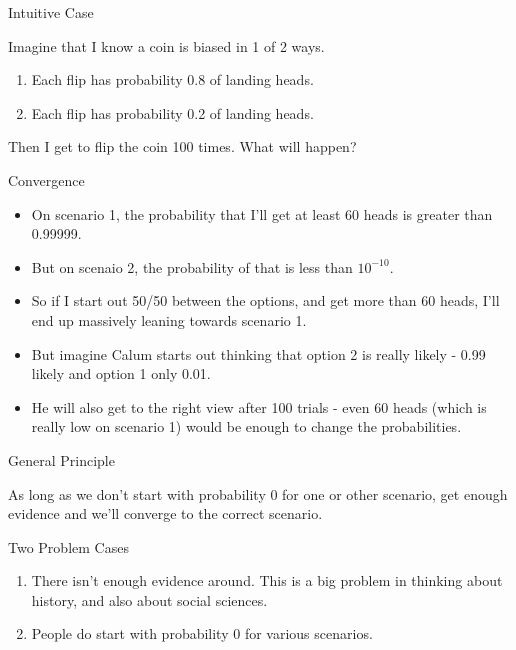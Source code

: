 \documentclass[
  ignorenonframetext,
]{beamer}
\providecommand{\tightlist}{%
  \setlength{\itemsep}{0pt}\setlength{\parskip}{0pt}}
\renewcommand{\,}{\text{, }}
\begin{document}
\begin{frame}{Intuitive Case}
\protect\hypertarget{intuitive-case-1}{}

Imagine that I know a coin is biased in 1 of 2 ways.

\begin{enumerate}
\tightlist
\item
  Each flip has probability 0.8 of landing heads.
\item
  Each flip has probability 0.2 of landing heads.
\end{enumerate}

Then I get to flip the coin 100 times. What will happen?

\end{frame}

\begin{frame}{Convergence}
\protect\hypertarget{convergence-5}{}

\begin{itemize}
\tightlist
\item
  On scenario 1, the probability that I'll get at least 60 heads is
  greater than 0.99999.
\item
  But on scenaio 2, the probability of that is less than \(10^{-10}\).
\item
  So if I start out 50/50 between the options, and get more than 60
  heads, I'll end up massively leaning towards scenario 1. \pause
\item
  But imagine Calum starts out thinking that option 2 is really likely -
  0.99 likely and option 1 only 0.01.
\item
  He will also get to the right view after 100 trials - even 60 heads
  (which is really low on scenario 1) would be enough to change the
  probabilities.
\end{itemize}

\end{frame}

\begin{frame}{General Principle}
\protect\hypertarget{general-principle-2}{}

As long as we don't start with probability 0 for one or other scenario,
get enough evidence and we'll converge to the correct scenario.

\end{frame}

\begin{frame}{Two Problem Cases}
\protect\hypertarget{two-problem-cases-1}{}

\begin{enumerate}
\tightlist
\item
  There isn't enough evidence around. This is a big problem in thinking
  about history, and also about social sciences.
\item
  People do start with probability 0 for various scenarios.
\end{enumerate}

\end{frame}
\end{document}
